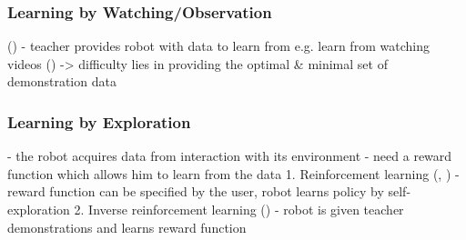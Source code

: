 \subsubsection{Learning by Watching/Observation}\label{sssec:LbObservation}
(\cite{kuniyoshi1994learning})
- teacher provides robot with data to learn from e.g. learn from watching videos (\cite{Yang2015})
     -> difficulty lies in providing the optimal \& minimal set of demonstration data

\subsubsection{Learning by Exploration}\label{sssec:LbExploration}
- the robot acquires data from interaction with its environment
- need a reward function which allows him to learn from the data
1. Reinforcement learning (\cite{sutton1998reinforcement}, \cite{mnih2015human})
     - reward function can be specified by the user, robot learns policy by self-exploration
    2. Inverse reinforcement learning (\cite{abbeel2004apprenticeship})
     - robot is given teacher demonstrations and learns reward function

 